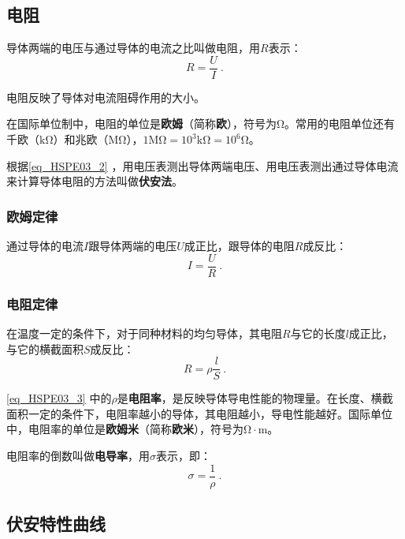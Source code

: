 \subsection{电阻}

导体两端的电压与通过导体的电流之比叫做电阻，用$R$表示：
\begin{equation}\label{eq_HSPE03_2}
R=\frac{U}{I}~.
\end{equation}

电阻反映了导体对电流阻碍作用的大小。

在国际单位制中，电阻的单位是\textbf{欧姆}（简称\textbf{欧}），符号为$\mathrm{\Omega}$。常用的电阻单位还有千欧（$\mathrm{k\Omega}$）和兆欧（$\mathrm{M\Omega}$），$1\mathrm{M\Omega}=10^3\mathrm{k\Omega}=10^6\mathrm{\Omega}$。

根据\autoref{eq_HSPE03_2} ，用电压表测出导体两端电压、用电压表测出通过导体电流来计算导体电阻的方法叫做\textbf{伏安法}。

\subsubsection{欧姆定律}

通过导体的电流$I$跟导体两端的电压$U$成正比，跟导体的电阻$R$成反比：
\begin{equation}
I=\frac{U}{R}~.
\end{equation}

\subsubsection{电阻定律}

在温度一定的条件下，对于同种材料的均匀导体，其电阻$R$与它的长度$l$成正比，与它的横截面积$S$成反比：
\begin{equation}\label{eq_HSPE03_3}
R=\rho \frac{l}{S}~.
\end{equation}

\autoref{eq_HSPE03_3} 中的$\rho$是\textbf{电阻率}，是反映导体导电性能的物理量。在长度、横截面积一定的条件下，电阻率越小的导体，其电阻越小，导电性能越好。国际单位中，电阻率的单位是\textbf{欧姆米}（简称\textbf{欧米}），符号为$\mathrm{\Omega\cdot m}$。

电阻率的倒数叫做\textbf{电导率}，用$\sigma$表示，即：
\begin{equation}
\sigma = \frac{1}{\rho}~.
\end{equation}

\subsection{伏安特性曲线}

